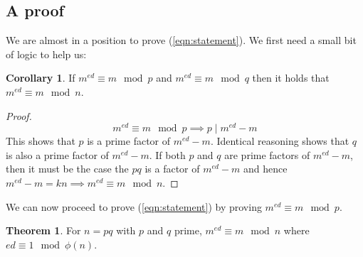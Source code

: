 \documentclass[]{scrartcl}
\theoremstyle{definition}
\newtheorem{thm}{Theorem}
\newtheorem{cor}{Corollary}
\let\oldref\ref
\renewcommand{\ref}[1]{(\oldref{#1})}
\begin{document}
\subsection{A proof}
We are almost in a position to prove \ref{eqn:statement}. We first need a small bit of logic to help us:
\begin{cor}\label{cor:crt}
    If $m^{ed} \equiv m \mod p$ and $m^{ed} \equiv m \mod q$ then it holds that $m^{ed} \equiv m \mod n$.
\end{cor}
\begin{proof}
    \begin{equation}
        m^{ed} \equiv m \mod p \implies p \mid m^{ed} - m
    \end{equation}
    This shows that $p$ is a prime factor of $m^{ed} - m$. Identical reasoning shows that $q$ is also a prime factor of $m^{ed} - m$. If both $p$ and $q$ are prime factors of $m^{ed} - m$, then it must be the case the $pq$ is a factor of $m^{ed} - m$ and hence $m^{ed} - m = kn \implies m^{ed} \equiv m \mod n$.
\end{proof}
We can now proceed to prove \ref{eqn:statement} by proving $m^{ed} \equiv m \mod p$.
\begin{thm}
For $n = pq$ with $p$ and $q$ prime, $m^{ed} \equiv m \mod n$ where $ed \equiv 1 \mod \phi(n)$.
\end{thm}
\end{document}
